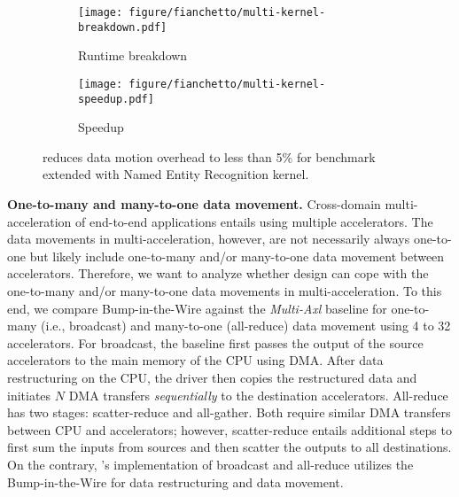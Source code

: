 \begin{figure}[t!]
\begin{subfigure}[ht!]{\columnwidth}
\centering
\texttt{[image: figure/fianchetto/multi-kernel-breakdown.pdf]}
\caption{Runtime breakdown}
\label{fig:res:multi-kernel-breakdown}
\end{subfigure}
%
\begin{subfigure}[ht!]{\columnwidth}
\centering
\hspace{-0.75cm}
\texttt{[image: figure/fianchetto/multi-kernel-speedup.pdf]}
\caption{Speedup}
\label{fig:res:multi-kernel-speedup}
\end{subfigure}
%
\caption{\dmx reduces data motion overhead to less than 5\% for \pir benchmark extended with Named Entity Recognition kernel.
}
\label{fig:res:multi-kernel}
\vspace{-3ex}
\end{figure}

\noindent \textbf{One-to-many and many-to-one data movement.}
%
Cross-domain multi-acceleration of end-to-end applications entails using multiple accelerators.
%
The data movements in multi-acceleration, however, are not necessarily always one-to-one but likely include one-to-many and/or many-to-one data movement between accelerators.
%
Therefore, we want to analyze whether \dmx design can cope with the one-to-many and/or many-to-one data movements in multi-acceleration.
%
To this end, we compare Bump-in-the-Wire \drx against the \emph{Multi-Axl} baseline for one-to-many (i.e., broadcast) and many-to-one (all-reduce) data movement using 4 to 32 accelerators.
%
For broadcast, the baseline first passes the output of the source accelerators to the main memory of the CPU using DMA.
%
After data restructuring on the CPU, the driver then copies the restructured data and initiates $N$ DMA transfers \emph{sequentially} to the destination accelerators. 
%
All-reduce has two stages: scatter-reduce and all-gather.
%
Both require similar DMA transfers between CPU and accelerators; however, scatter-reduce entails additional steps to first sum the inputs from sources and then scatter the outputs to all destinations. 
%
On the contrary, \dmx's implementation of broadcast and all-reduce utilizes the Bump-in-the-Wire \drx for data restructuring and data movement.
%

